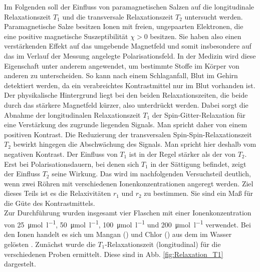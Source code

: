 \documentclass[../main.tex]{subfiles}
\begin{document}
    Im Folgenden soll der Einfluss von paramagnetischen Salzen auf die longitudinale Relaxationszeit $T_{1}$ und die transversale Relaxationszeit $T_{2}$ untersucht werden. Paramagnetische Salze besitzen Ionen mit freien, ungepaarten Elektronen, die eine positive magnetische Suszeptibilität $\chi > 0$ besitzen. Sie haben also einen verstärkenden Effekt auf das umgebende Magnetfeld und somit insbesondere auf das im Verlauf der Messung angelegte Polarisationsfeld. In der Medizin wird diese Eigenschaft unter anderem angewendet, um bestimmte Stoffe im Körper von anderen zu unterscheiden. So kann nach einem Schlaganfall, Blut im Gehirn detektiert werden, da ein verabreichtes Kontrastmittel nur im Blut vorhanden ist. Der physikalische Hintergrund liegt bei den beiden Relaxationszeiten, die beide durch das stärkere Magnetfeld kürzer, also unterdrückt werden. Dabei sorgt die Abnahme der longitudinalen Relaxationszeit $T_{1}$ der Spin-Gitter-Relaxation für eine Verstärkung des zugrunde liegenden Signals. Man spricht daher von einem positiven Kontrast. Die Reduzierung der transversalen Spin-Spin-Relaxationszeit $T_{2}$ bewirkt hingegen die Abschwächung des Signals. Man spricht hier deshalb vom negativen Kontrast. Der Einfluss von $T_{1}$ ist in der Regel stärker als der von $T_{2}$. Erst bei Polarisationsdauern, bei denen sich $T_{1}$ in der Sättigung befindet, zeigt der Einfluss $T_{2}$ seine Wirkung. Das wird im nachfolgenden Versuchsteil deutlich, wenn zwei Röhren mit verschiedenen Ionenkonzentrationen angeregt werden. Ziel dieses Teils ist es die Relaxivitäten $r_{1}$ und $r_{2}$ zu bestimmen. Sie sind ein Maß für die Güte des Kontrastmittels. \\
    Zur Durchführung wurden insgesamt vier Flaschen mit einer Ionenkonzentration von \SI{25}{\micro \mol \per \litre}, \SI{50}{\micro \mol \per \litre}, \SI{100}{\micro \mol \per \litre} und \SI{200}{\micro \mol \per \litre} verwendet. Bei den Ionen handelt es sich um Mangan () und Chlor () aus dem im Wasser gelösten . Zunächst wurde die $T_{1}$-Relaxationszeit (longitudinal) für die verschiedenen Proben ermittelt. Diese sind in Abb. \ref{fig:Relaxation_T1} dargestelt.
\end{document}
